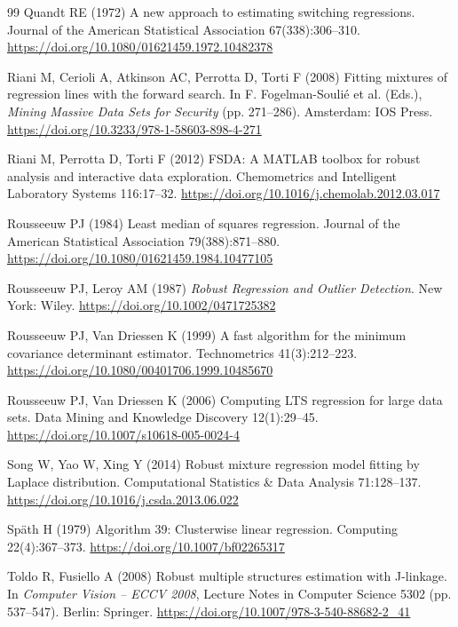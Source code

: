 \begin{thebibliography}{99}
 Quandt RE (1972) A new approach to
estimating switching regressions. Journal of the American Statistical Association 67(338):306--310. \url{https://doi.org/10.1080/01621459.1972.10482378}

 Riani M, Cerioli A, Atkinson AC, Perrotta D, Torti F (2008) Fitting mixtures of regression lines with the forward search. In F. Fogelman-Souli\'{e} et al. (Eds.), \textit{Mining Massive Data Sets for Security} (pp. 271--286). Amsterdam: IOS Press. \url{https://doi.org/10.3233/978-1-58603-898-4-271}

 Riani M, Perrotta D, Torti F (2012) FSDA: A MATLAB toolbox for robust analysis and interactive data exploration. Chemometrics and Intelligent Laboratory Systems 116:17--32. \url{https://doi.org/10.1016/j.chemolab.2012.03.017}

 Rousseeuw PJ (1984) Least median of squares
regression. Journal of the American Statistical Association 79(388):871--880. \url{https://doi.org/10.1080/01621459.1984.10477105}

 Rousseeuw PJ, Leroy AM (1987) \textit{Robust Regression and Outlier Detection}. New York: Wiley. \url{https://doi.org/10.1002/0471725382}

 Rousseeuw PJ, Van Driessen K (1999) A fast algorithm for the minimum covariance determinant estimator. Technometrics 41(3):212--223. \url{https://doi.org/10.1080/00401706.1999.10485670}

 Rousseeuw PJ, Van Driessen K (2006) Computing LTS regression for large data sets. Data Mining and
Knowledge Discovery 12(1):29--45. \url{https://doi.org/10.1007/s10618-005-0024-4}

 Song W, Yao W, Xing Y (2014) Robust mixture regression model fitting by Laplace distribution. Computational Statistics \& Data Analysis 71:128--137. \url{https://doi.org/10.1016/j.csda.2013.06.022}

 Sp\"ath H (1979) Algorithm 39: Clusterwise
linear regression. Computing 22(4):367--373. \url{https://doi.org/10.1007/bf02265317}

 Toldo R, Fusiello A (2008) Robust multiple structures estimation with J-linkage. In \textit{Computer Vision -- ECCV 2008}, Lecture Notes in Computer Science 5302 (pp. 537--547). Berlin: Springer. \url{https://doi.org/10.1007/978-3-540-88682-2\_41}


\end{thebibliography}
